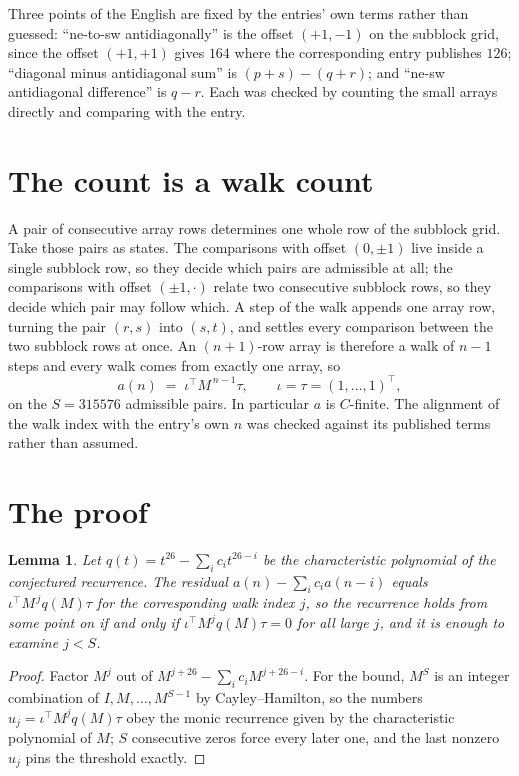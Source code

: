 \documentclass[11pt,a4paper]{article}
\theoremstyle{plain}
\newtheorem{lemma}[theorem]{Lemma}
\theoremstyle{definition}
\begin{document}
Three points of the English are fixed by the entries' own terms rather than guessed:
``ne-to-sw antidiagonally'' is the offset $(+1,-1)$ on the subblock grid, since the offset
$(+1,+1)$ gives $164$ where the corresponding entry publishes $126$; ``diagonal minus
antidiagonal sum'' is $(p+s)-(q+r)$; and ``ne-sw antidiagonal difference'' is $q-r$. Each was
checked by counting the small arrays directly and comparing with the entry.

\section{The count is a walk count}

A pair of consecutive array rows determines one whole row of the subblock grid. Take those
pairs as states. The comparisons with offset $(0,\pm1)$ live inside a single subblock row, so
they decide which pairs are admissible at all; the comparisons with offset $(\pm1,\cdot)$
relate two consecutive subblock rows, so they decide which pair may follow which. A step of the
walk appends one array row, turning the pair $(r,s)$ into $(s,t)$, and settles every comparison
between the two subblock rows at once. An $(n+1)$-row array is therefore a walk of $n-1$ steps
and every walk comes from exactly one array, so
\[
a(n)\;=\;\iota^{\!\top}M^{\,n-1}\tau,\qquad \iota=\tau=(1,\dots,1)^{\!\top},
\]
on the $S=315576$ admissible pairs. In particular $a$ is $C$-finite. The alignment of the walk
index with the entry's own $n$ was checked against its published terms rather than assumed.

\section{The proof}

\begin{lemma}\label{lem:crit}
Let $q(t)=t^{26}-\sum_i c_it^{26-i}$ be the characteristic polynomial of the
conjectured recurrence. The residual $a(n)-\sum_ic_ia(n-i)$ equals
$\iota^{\!\top}M^{\,j}q(M)\tau$ for the corresponding walk index $j$, so the recurrence
holds from some point on if and only if $\iota^{\!\top}M^{j}q(M)\tau=0$ for all large $j$,
and it is enough to examine $j<S$.
\end{lemma}

\begin{proof}
Factor $M^{j}$ out of $M^{j+26}-\sum_ic_iM^{j+26-i}$. For the bound, $M^{S}$
is an integer combination of $I,M,\dots,M^{S-1}$ by Cayley--Hamilton, so the numbers
$u_j=\iota^{\!\top}M^{j}q(M)\tau$ obey the monic recurrence given by the characteristic
polynomial of $M$; $S$ consecutive zeros force every later one, and the last nonzero $u_j$
pins the threshold exactly.
\end{proof}
\end{document}
